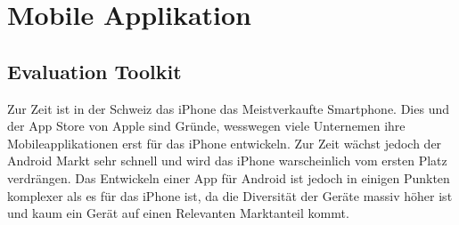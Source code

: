 
\newpage
\section{Mobile Applikation} %
\label{sec:Mobile Applikation}

\subsection{Evaluation Toolkit} %
\label{sub:Evaluation Toolkit}
Zur Zeit ist in der Schweiz das iPhone das Meistverkaufte Smartphone. Dies und der App Store von Apple sind Gründe, wesswegen viele Unternemen ihre Mobileapplikationen erst für das iPhone entwickeln. Zur Zeit wächst jedoch der Android Markt sehr schnell und wird das iPhone warscheinlich vom ersten Platz verdrängen. Das Entwickeln einer App für Android ist jedoch in einigen Punkten komplexer als es für das iPhone ist, da die Diversität der Geräte massiv höher ist und kaum ein Gerät auf einen Relevanten Marktanteil kommt.
